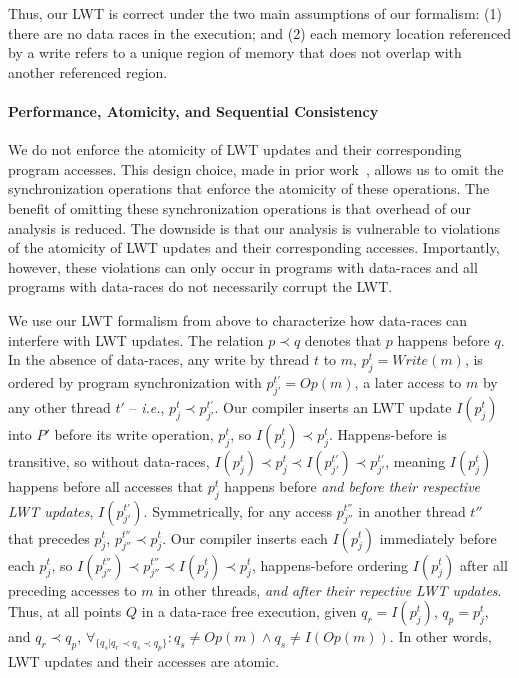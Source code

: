 \documentclass[preprint,9pt]{sigplanconf}
\newcommand{\lwt}{LWT\xspace}
\begin{document}
Thus, our \lwt is correct under the two main assumptions of our formalism: (1)
there are no data races in the execution; and (2) each memory location
referenced by a write refers to a unique region of memory that does not overlap
with another referenced region.  

\paragraph{Performance, Atomicity, and Sequential Consistency}

We do not enforce the atomicity of \lwt updates and their corresponding program
accesses.  This design choice, made in prior work~\cite{fasttrack,recon},
allows us to omit the synchronization operations that enforce the atomicity of
these operations.  The benefit of omitting these synchronization operations is
that overhead of our analysis is reduced. The downside is that our analysis is
vulnerable to violations of the atomicity of \lwt updates and their
corresponding accesses. Importantly, however, these violations can only occur
in programs with data-races and all programs with data-races do not necessarily
corrupt the \lwt. 

We use our \lwt formalism from above to characterize how data-races can
interfere with \lwt updates.  The relation $p \prec q$ denotes that $p$ happens
before $q$.  In the absence of data-races, any write by thread $t$ to $m$,
$p^{t}_{j} = Write(m)$, is ordered by program synchronization with $p^{t'}_{j'}
= Op(m)$, a later access to $m$ by any other thread $t'$ -- {\em i.e.},
$p^{t}_{j} \prec p^{t'}_{j'}$.  Our compiler inserts an \lwt update
$I(p^{t}_{j})$ into $P'$ before its write operation, $p^{t}_{j}$, so
$I(p^{t}_{j}) \prec p^{t}_{j}$.  Happens-before is transitive, so without
data-races, $I(p^{t}_{j}) \prec p^{t}_{j} \prec I(p^{t'}_{j'}) \prec
p^{t'}_{j'}$, meaning $I(p^{t}_{j})$ happens before all accesses that
$p^{t}_{j}$ happens before {\em and before their respective \lwt updates},
$I(p^{t'}_{j'})$.  Symmetrically, for any access $p^{t''}_{j''}$ in another
thread $t''$ that precedes $p^{t}_{j}$, $p^{t''}_{j''} \prec p^{t}_{j}$.  Our
compiler inserts each $I(p^{t}_{j})$ immediately before each $p^{t}_{j}$, so
$I(p^{t''}_{j''}) \prec p^{t''}_{j''} \prec I(p^{t}_{j}) \prec p^{t}_{j}$,
happens-before ordering $I(p^{t}_{j})$ after all preceding accesses to $m$ in
other threads, {\em and after their repective \lwt updates}.  Thus, at all
points $Q$ in a data-race free execution, given $q_r = I(p^{t}_{j})$, $q_p =
p^{t}_{j}$, and $q_r \prec q_p$, $\forall_{ \{q_s | q_r \prec q_s \prec q_p
\}}: q_s \ne Op(m) \wedge q_s \ne I(Op(m)) $.  In other words, \lwt updates and
their accesses are atomic.
\end{document}
